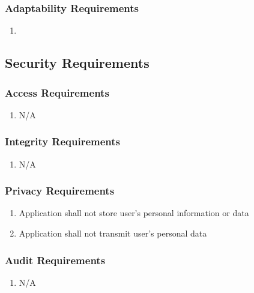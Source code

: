 \documentclass[]{article}
\begin{document}
\subsubsection{Adaptability Requirements}
\label{ssub:adaptability_requirements}
\begin{enumerate}[{MS}1. ]
	\item 
\end{enumerate}


\subsection{Security Requirements}
\label{sub:security_requirements}

\subsubsection{Access Requirements}
\label{ssub:access_requirements}
\begin{enumerate}[{SR}1. ]
	\item N/A
\end{enumerate}

\subsubsection{Integrity Requirements}
\label{ssub:integrity_requirements}
\begin{enumerate}[{SR}1. ]
	\item N/A
\end{enumerate}

\subsubsection{Privacy Requirements}
\label{ssub:privacy_requirements}
\begin{enumerate}[{SR}1. ]
	\item Application shall not store user's personal information or data
	\item Application shall not transmit user's personal data
\end{enumerate}

\subsubsection{Audit Requirements}
\label{ssub:audit_requirements}
\begin{enumerate}[{SR}1. ]
	\item N/A
\end{enumerate}
\end{document}
